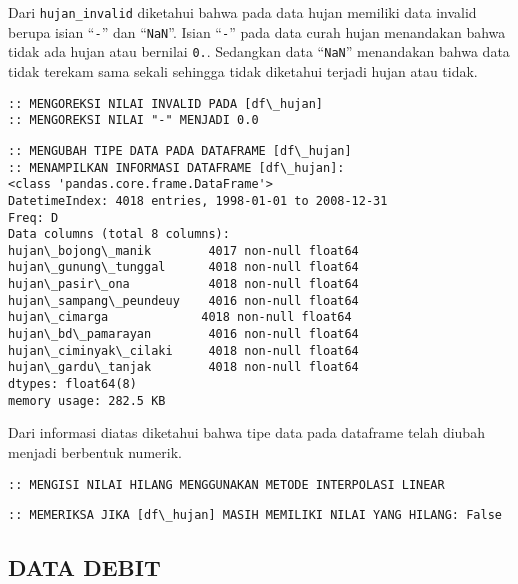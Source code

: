 \documentclass[11pt]{article}
\begin{document}
    Dari \texttt{hujan\_invalid} diketahui bahwa pada data hujan memiliki
data invalid berupa isian ``\texttt{-}'' dan ``\texttt{NaN}''. Isian
``\texttt{-}'' pada data curah hujan menandakan bahwa tidak ada hujan
atau bernilai \texttt{0.}. Sedangkan data ``\texttt{NaN}'' menandakan
bahwa data tidak terekam sama sekali sehingga tidak diketahui terjadi
hujan atau tidak.

    \begin{Verbatim}[commandchars=\\\{\}]
:: MENGOREKSI NILAI INVALID PADA [df\_hujan]
:: MENGOREKSI NILAI "-" MENJADI 0.0
    \end{Verbatim}

    \begin{Verbatim}[commandchars=\\\{\}]
:: MENGUBAH TIPE DATA PADA DATAFRAME [df\_hujan]
:: MENAMPILKAN INFORMASI DATAFRAME [df\_hujan]:
<class 'pandas.core.frame.DataFrame'>
DatetimeIndex: 4018 entries, 1998-01-01 to 2008-12-31
Freq: D
Data columns (total 8 columns):
hujan\_bojong\_manik        4017 non-null float64
hujan\_gunung\_tunggal      4018 non-null float64
hujan\_pasir\_ona           4018 non-null float64
hujan\_sampang\_peundeuy    4016 non-null float64
hujan\_cimarga             4018 non-null float64
hujan\_bd\_pamarayan        4016 non-null float64
hujan\_ciminyak\_cilaki     4018 non-null float64
hujan\_gardu\_tanjak        4018 non-null float64
dtypes: float64(8)
memory usage: 282.5 KB
    \end{Verbatim}

    Dari informasi diatas diketahui bahwa tipe data pada dataframe telah
diubah menjadi berbentuk numerik.

    \begin{Verbatim}[commandchars=\\\{\}]
:: MENGISI NILAI HILANG MENGGUNAKAN METODE INTERPOLASI LINEAR
    \end{Verbatim}

    \begin{Verbatim}[commandchars=\\\{\}]
:: MEMERIKSA JIKA [df\_hujan] MASIH MEMILIKI NILAI YANG HILANG: False
    \end{Verbatim}

    \hypertarget{data-debit}{%
\subsection{DATA DEBIT}\label{data-debit}}
\end{document}
